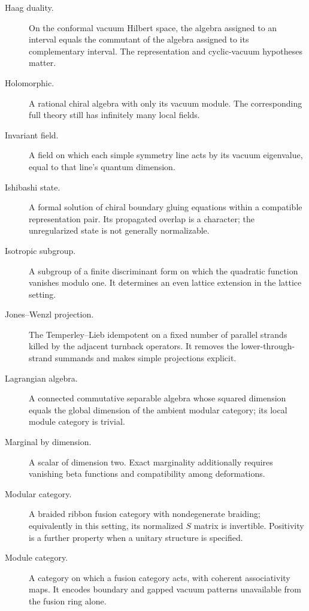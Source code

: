 \begin{description}
\item[Haag duality.]On the conformal vacuum Hilbert space,
the algebra assigned to an interval equals the commutant of
the algebra assigned to its complementary interval. The
representation and cyclic-vacuum hypotheses matter.

\item[Holomorphic.]A rational chiral algebra with only its vacuum
module. The corresponding full theory still has infinitely many
local fields.

\item[Invariant field.]A field on which each simple symmetry line
acts by its vacuum eigenvalue, equal to that line's quantum
dimension.

\item[Ishibashi state.]A formal solution of chiral boundary
gluing equations within a compatible representation pair.
Its propagated overlap is a character; the unregularized
state is not generally normalizable.

\item[Isotropic subgroup.]A subgroup of a finite discriminant
form on which the quadratic function vanishes modulo one.
It determines an even lattice extension in the lattice setting.

\item[Jones--Wenzl projection.]The Temperley--Lieb idempotent
on a fixed number of parallel strands killed by the adjacent
turnback operators. It removes the lower-through-strand
summands and makes simple projections explicit.

\item[Lagrangian algebra.]A connected commutative separable algebra
whose squared dimension equals the global dimension of the
ambient modular category; its local module category is trivial.

\item[Marginal by dimension.]A scalar of dimension two. Exact
marginality additionally requires vanishing beta functions and
compatibility among deformations.

\item[Modular category.]A braided ribbon fusion category with
nondegenerate braiding; equivalently in this setting, its
normalized $S$ matrix is invertible. Positivity is a further
property when a unitary structure is specified.

\item[Module category.]A category on which a fusion category acts,
with coherent associativity maps. It encodes boundary and gapped
vacuum patterns unavailable from the fusion ring alone.


\end{description}
